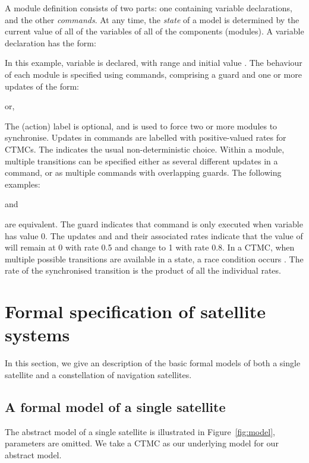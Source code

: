 \documentclass[preprint,12pt]{qrei}
\begin{document}
A module definition consists of two parts: one containing variable declarations, and the other {\it commands}. At any time, the {\it state} of a model is determined by the current value of all of the variables of all of the components (modules). A variable declaration has the form:


In this example, variable  is declared, with range  and initial value . The behaviour of each module is specified using commands, comprising a guard and one or more updates of the form:

or,


The (action) label is optional, and is used to force two or more modules to synchronise. Updates in commands are labelled with positive-valued rates \cite{KNP09} for CTMCs. The  indicates the usual non-deterministic choice. Within a module, multiple transitions can be specified either as several different updates in a command, or as multiple commands with overlapping guards. The following examples:

and

are equivalent. The guard  indicates that command is only executed when variable  has value 0. The updates  and  and their associated rates indicate that the value of  will remain at 0 with rate 0.5 and change to 1 with rate 0.8. In a CTMC, when multiple possible transitions are available in a state, a race condition occurs \cite{KNP07}. The rate of the synchronised transition is the product of all the individual rates.




\section{Formal specification of satellite systems}\label{sect:fmc}

In this section, we give an description of the basic formal models of both a single satellite and a constellation of navigation satellites.

\subsection{A formal model of a single satellite}

The abstract model of a single satellite is illustrated in Figure~\ref{fig:model}, parameters are omitted. We take a CTMC as our underlying  model for our abstract model.
\end{document}
